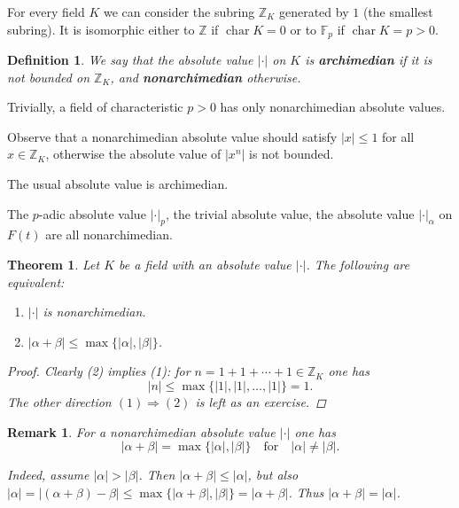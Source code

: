 \documentclass{article}
\newcommand{\term}{\textbf}
\newcommand{\ZZ}{\mathbb{Z}}
\newcommand{\FF}{\mathbb{F}}
\DeclareMathOperator{\fchar}{char}
\newcommand{\examplesymbol}{$\blacktriangle$}
\renewcommand{\qedsymbol}{$\blacksquare$}
\theoremstyle{myplain}
\newtheorem{theorem}[proposition]{Theorem}
\theoremstyle{mydefinition}
\newtheorem{definition}[proposition]{Definition}
\newtheorem{remark}[proposition]{Remark}
\newenvironment{example}
  {\pushQED{\qed}\renewcommand{\qedsymbol}{\examplesymbol}\examplex}
  {\popQED\endexamplex}
\begin{document}
For every field $K$ we can consider the subring $\ZZ_K$ generated by $1$ (the
smallest subring). It is isomorphic either to $\ZZ$ if $\fchar K = 0$ or to
$\FF_p$ if $\fchar K = p > 0$.

\begin{definition}
  We say that the absolute value $|\cdot|$ on $K$ is \term{archimedian} if it is
  not bounded on $\ZZ_K$, and \term{nonarchimedian} otherwise.
\end{definition}

Trivially, a field of characteristic $p > 0$ has only nonarchimedian absolute
values.

Observe that a nonarchimedian absolute value should satisfy $|x| \le 1$ for all
$x \in \ZZ_K$, otherwise the absolute value of $|x^n|$ is not bounded.

\begin{example}
  The usual absolute value is archimedian.

  The $p$-adic absolute value $|\cdot|_p$, the trivial absolute value, the
  absolute value $|\cdot|_\alpha$ on $F (t)$ are all nonarchimedian.
\end{example}

\begin{theorem}
  Let $K$ be a field with an absolute value $|\cdot|$. The following are
  equivalent:

  \begin{enumerate}
  \item $|\cdot|$ is nonarchimedian.

  \item $|\alpha+\beta| \le \max \{ |\alpha|, |\beta| \}$.
  \end{enumerate}

  \begin{proof}
    Clearly (2) implies (1): for $n = 1 + 1 + \cdots + 1 \in \ZZ_K$ one has
    \[ |n| \le \max \{ |1|, |1|, \ldots, |1| \} = 1. \]
    The other direction $(1) \Rightarrow (2)$ is left as an exercise.
  \end{proof}
\end{theorem}

\begin{remark}
  For a nonarchimedian absolute value $|\cdot|$ one has
  \[ |\alpha+\beta| = \max \{|\alpha|, |\beta| \} \quad\text{for}\quad |\alpha| \ne |\beta|. \]

  Indeed, assume $|\alpha| > |\beta|$. Then $|\alpha+\beta| \le |\alpha|$, but
  also
  $|\alpha| = |(\alpha+\beta)-\beta| \le \max \{ |\alpha+\beta|, |\beta| \} =
  |\alpha+\beta|$. Thus $|\alpha+\beta| = |\alpha|$.
\end{remark}
\end{document}
